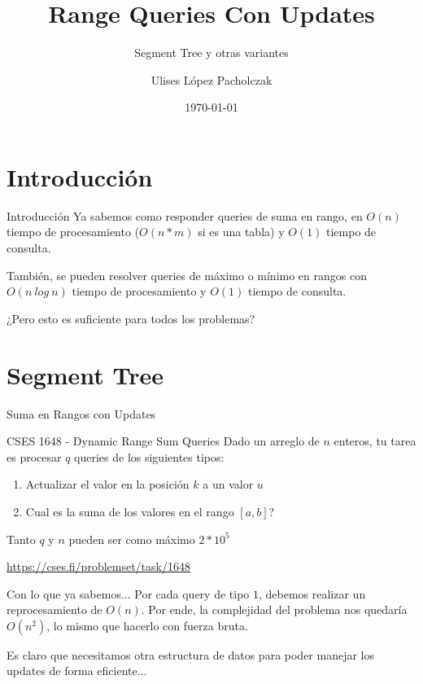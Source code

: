 \documentclass{beamer}
\title{Range Queries Con Updates}
\subtitle{Segment Tree y otras variantes}
\author{Ulises López Pacholczak}
\date{\today}
\begin{document}
\begin{frame}
\titlepage
\end{frame}

\begin{frame}
\small
\tableofcontents[hideallsubsections]
\end{frame}

\section{Introducción}

\begin{frame}{Introducción}
Ya sabemos como responder queries de suma en rango, en $O(n)$ tiempo de procesamiento ($O(n*m)$ si es una tabla) y $O(1)$ tiempo de consulta.

\pause
También, se pueden resolver queries de máximo o mínimo en rangos con $O(n\:log\: n)$ tiempo de procesamiento y $O(1)$ tiempo de consulta.

\pause
¿Pero esto es suficiente para todos los problemas?
\end{frame}

\section{Segment Tree}

\begin{frame}{Suma en Rangos con Updates}

\begin{block}{CSES 1648 - Dynamic Range Sum Queries}
Dado un arreglo de $n$ enteros, tu tarea es procesar $q$ queries de los siguientes tipos:
\begin{enumerate}
    \item Actualizar el valor en la posición $k$ a un valor $u$
    \item Cual es la suma de los valores en el rango $[a,b]$?
\end{enumerate}
Tanto $q$ y $n$ pueden ser como máximo $2*10^5$
\end{block}

\url{https://cses.fi/problemset/task/1648}
\end{frame}

\begin{frame}{Con lo que ya sabemos...}
Por cada query de tipo $1$, debemos realizar un reprocesamiento de $O(n)$. Por ende, la complejidad del problema nos quedaría $O(n^2)$, lo mismo que hacerlo con fuerza bruta.

\pause
Es claro que necesitamos otra estructura de datos para poder manejar los updates de forma eficiente...
\end{frame}
\end{document}
